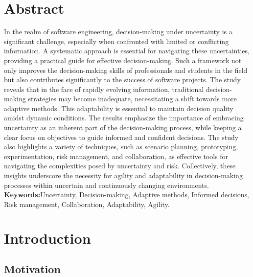 \documentclass{article}
\begin{document}
\section*{Abstract}
In the realm of software engineering, decision-making under uncertainty is a significant challenge, especially when confronted with limited or conflicting information. A systematic approach is essential for navigating these uncertainties, providing a practical guide for effective decision-making. Such a framework not only improves the decision-making skills of professionals and students in the field but also contributes significantly to the success of software projects. The study reveals that in the face of rapidly evolving information, traditional decision-making strategies may become inadequate, necessitating a shift towards more adaptive methods. This adaptability is essential to maintain decision quality amidst dynamic conditions. The results emphasize the importance of embracing uncertainty as an inherent part of the decision-making process, while keeping a clear focus on objectives to guide informed and confident decisions. The study also highlights a variety of techniques, such as scenario planning, prototyping, experimentation, risk management, and collaboration, as effective tools for navigating the complexities posed by uncertainty and risk. Collectively, these insights underscore the necessity for agility and adaptability in decision-making processes within uncertain and continuously changing environments.
\newline
\newline
\textbf{Keywords:}Uncertainty, Decision-making, Adaptive methods, Informed decisions, Risk management, Collaboration, Adaptability, Agility.
\newpage

\section{Introduction}

\subsection{Motivation}
\end{document}
